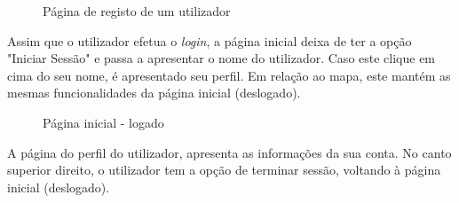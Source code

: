\documentclass[a4paper,12pt]{scrreprt}
\newcommand{\tab}{
    \hspace{1cm}}
\begin{document}
\begin{figure}[H]
    \centering
    \caption{Página de registo de um utilizador}
\end{figure}
\clearpage
\tab Assim que o utilizador efetua o \textit{login}, a página inicial deixa de ter a opção "Iniciar Sessão" e passa a apresentar o nome do utilizador. Caso este clique em cima do seu nome, é apresentado seu perfil. Em relação ao mapa, este mantém as mesmas funcionalidades da página inicial (deslogado).

\begin{figure}[H]
    \centering
    \caption{Página inicial - logado}
\end{figure}
\clearpage
\tab A página do perfil do utilizador, apresenta as informações da sua conta. No canto superior direito, o utilizador tem a opção de terminar sessão, voltando à página inicial (deslogado).
\end{document}
